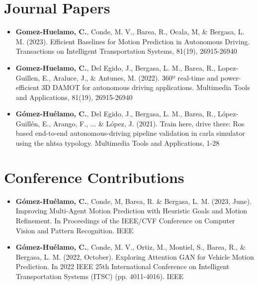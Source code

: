 \begin{refsection}

\section*{Journal Papers}

\begin{itemize}

\item \textbf{Gomez-Huelamo, C.}, Conde, M. V., Barea, R., Ocala, M, \& Bergasa, L. M. (2023). Efficient Baselines for Motion Prediction in Autonomous Driving. Transactions on Intelligent Transportation Systems, 81(19), 26915-26940

\item \textbf{Gomez-Huelamo, C.}, Del Egido, J., Bergasa, L. M., Barea, R., Lopez-Guillen, E., Araluce, J., \& Antunes, M. (2022). 360º real-time and power-efficient 3D DAMOT for autonomous driving applications. Multimedia Tools and Applications, 81(19), 26915-26940

\item \textbf{Gómez-Huélamo, C.}, Del Egido, J., Bergasa, L. M., Barea, R., López-Guillén, E., Arango, F., ... \& López, J. (2021). Train here, drive there: Ros based end-to-end autonomous-driving pipeline validation in carla simulator using the nhtsa typology. Multimedia Tools and Applications, 1-28

\end{itemize}

\section*{Conference Contributions}

\begin{itemize}

\item \textbf{Gómez-Huélamo, C.}, Conde, M, Barea, R. \& Bergasa, L. M. (2023, June). Improving Multi-Agent Motion Prediction with Heuristic Goals and Motion Refinement. In Proceedings of the IEEE/CVF Conference on Computer Vision and Pattern Recognition. IEEE

\item \textbf{Gómez-Huélamo, C.}, Conde, M. V., Ortiz, M., Montiel, S., Barea, R., \& Bergasa, L. M. (2022, October). Exploring Attention GAN for Vehicle Motion Prediction. In 2022 IEEE 25th International Conference on Intelligent Transportation Systems (ITSC) (pp. 4011-4016). IEEE


\end{itemize}
\end{refsection}
